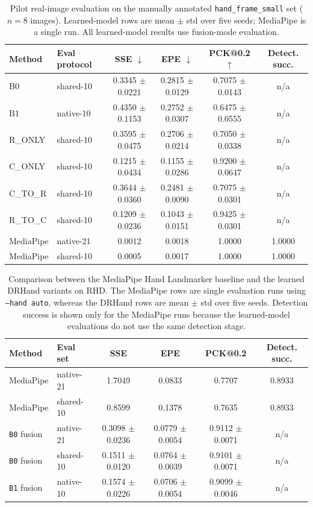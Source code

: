 \documentclass[10pt,letterpaper]{article}
\begin{document}
\begin{table}[H]
\centering
\footnotesize
\caption{Pilot real-image evaluation on the manually annotated \texttt{hand\_frame\_small} set ($n=8$ images). Learned-model rows are mean $\pm$ std over five seeds; MediaPipe is a single run. All learned-model results use fusion-mode evaluation.}
\label{tab:hand_frame_small_pilot}
\begin{tabular}{llcccc}
\toprule
Method & Eval protocol & SSE $\downarrow$ & EPE $\downarrow$ & PCK@0.2 $\uparrow$ & Detect. succ. \\
\midrule
B0 & shared-10 & 0.3345 $\pm$ 0.0221 & 0.2815 $\pm$ 0.0129 & 0.7075 $\pm$ 0.0143 & n/a \\
B1 & native-10 & 0.4350 $\pm$ 0.1153 & 0.2752 $\pm$ 0.0307 & 0.6475 $\pm$ 0.0555 & n/a \\
R\_ONLY & shared-10 & 0.3595 $\pm$ 0.0475 & 0.2706 $\pm$ 0.0214 & 0.7050 $\pm$ 0.0338 & n/a \\
C\_ONLY & shared-10 & 0.1215 $\pm$ 0.0434 & 0.1155 $\pm$ 0.0286 & 0.9200 $\pm$ 0.0647 & n/a \\
C\_TO\_R & shared-10 & 0.3644 $\pm$ 0.0360 & 0.2481 $\pm$ 0.0090 & 0.7075 $\pm$ 0.0301 & n/a \\
R\_TO\_C & shared-10 & 0.1209 $\pm$ 0.0236 & 0.1043 $\pm$ 0.0151 & 0.9425 $\pm$ 0.0301 & n/a \\
MediaPipe & native-21 & 0.0012 & 0.0018 & 1.0000 & 1.0000 \\
MediaPipe & shared-10 & 0.0005 & 0.0017 & 1.0000 & 1.0000 \\
\bottomrule
\end{tabular}
\end{table}

\begin{table}[H]
\centering
\footnotesize
\caption{Comparison between the MediaPipe Hand Landmarker baseline and the learned DRHand variants on RHD. The MediaPipe rows are single evaluation runs using \texttt{--hand auto}, whereas the DRHand rows are mean $\pm$ std over five seeds. Detection success is shown only for the MediaPipe runs because the learned-model evaluations do not use the same detection stage.}
\label{tab:mediapipe_baseline}
\begin{tabular}{llcccc}
\toprule
Method & Eval set & SSE & EPE & PCK@0.2 & Detect. succ. \\
\midrule
MediaPipe & native-21 & 1.7049 & 0.0833 & 0.7707 & 0.8933 \\
MediaPipe & shared-10 & 0.8599 & 0.1378 & 0.7635 & 0.8933 \\
\texttt{B0} fusion & native-21 & 0.3098 $\pm$ 0.0236 & 0.0779 $\pm$ 0.0054 & 0.9112 $\pm$ 0.0071 & n/a \\
\texttt{B0} fusion & shared-10 & 0.1511 $\pm$ 0.0120 & 0.0764 $\pm$ 0.0039 & 0.9101 $\pm$ 0.0071 & n/a \\
\texttt{B1} fusion & native-10 & 0.1574 $\pm$ 0.0226 & 0.0706 $\pm$ 0.0054 & 0.9099 $\pm$ 0.0046 & n/a \\
\bottomrule
\end{tabular}
\end{table}
\end{document}
